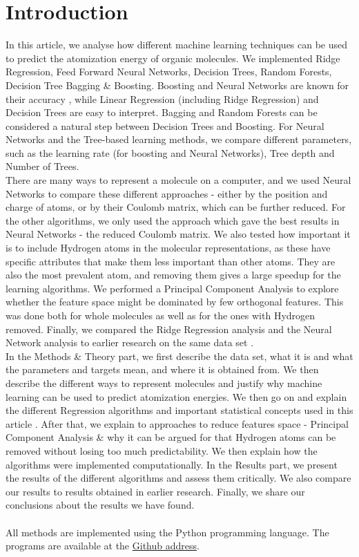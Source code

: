 \documentclass[11pt,a4paper,notitlepage]{article}
\begin{document}
\section{Introduction}
In this article, we analyse how different machine learning techniques can be used to predict the atomization energy of organic molecules. We implemented Ridge Regression, Feed Forward Neural Networks, Decision Trees, Random Forests, Decision Tree Bagging \&  Boosting. Boosting and Neural Networks are known for their accuracy \citep{hastie}, while Linear Regression (including Ridge Regression) and Decision Trees are easy to interpret. Bagging and Random Forests can be considered a natural step between Decision Trees and Boosting. For Neural Networks and the Tree-based learning methods, we compare different parameters, such as the learning rate (for boosting and Neural Networks), Tree depth and Number of Trees. \\There are many ways to represent a molecule on a computer, and we used Neural Networks to compare these different approaches - either by the position and charge of atoms, or by their Coulomb matrix, which can be further reduced. For the other algorithms, we only used the approach which gave the best results in Neural Networks - the reduced Coulomb matrix. We also tested how important it is to include Hydrogen atoms in the molecular representations, as these have specific attributes that make them less important than other atoms. They are also the most prevalent atom, and removing them gives a large speedup for the learning algorithms. We performed a Principal Component Analysis to explore whether the feature space might be dominated by few orthogonal features. This was done both for whole molecules as well as for the ones with Hydrogen removed. Finally, we compared the Ridge Regression analysis and the Neural Network analysis to earlier research on the same data set \citep{Atomization_network,Atomization_Ridge}.\\
In the Methods \& Theory part, we first describe the data set, what it is and what the parameters and targets mean, and where it is obtained from. We then describe the different ways to represent molecules and justify why machine learning can be used to predict atomization energies. We then go on and explain the different Regression algorithms and important statistical concepts used in this article . After that, we explain to approaches to reduce features space - Principal Component Analysis \& why it can be argued for that Hydrogen atoms can be removed without losing too much predictability. We then explain how the algorithms were implemented computationally. In the Results part, we present the results of the different algorithms and assess them critically. We also compare our results to results obtained in earlier research. Finally, we share our conclusions about the results we have found. \\\\All methods are implemented using the Python programming language. The programs are available at the \href{https://github.com/schraderSimon/FYS-STK/tree/master/project3}{Github address}. 
\end{document}
